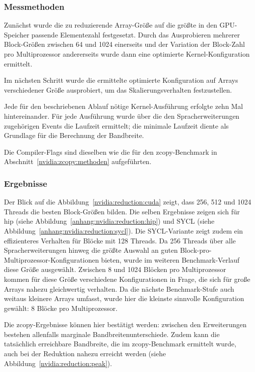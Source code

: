 \subsubsection{Messmethoden}
\label{nvidia:reduction:methoden}

Zunächst wurde die zu reduzierende Array-Größe auf die größte in den
GPU-Speicher passende Elementezahl festgesetzt. Durch das Ausprobieren mehrerer
Block-Größen zwischen \num{64} und \num{1024} einerseits und der Variation der
Block-Zahl pro Multiprozessor andererseits wurde dann eine optimierte
Kernel-Konfiguration ermittelt.

Im nächsten Schritt wurde die ermittelte optimierte Konfiguration auf Arrays
verschiedener Größe ausprobiert, um das Skalierungsverhalten festzustellen.

Jede für den beschriebenen Ablauf nötige Kernel-Ausführung erfolgte zehn Mal
hintereinander. Für jede Ausführung wurde über die den Spracherweiterungen
zugehörigen Events die Laufzeit ermittelt; die minimale Laufzeit diente als
Grundlage für die Berechnung der Bandbreite.

Die Compiler-Flags sind dieselben wie die für den zcopy-Benchmark in
Abschnitt~\ref{nvidia:zcopy:methoden} aufgeführten.

\subsubsection{Ergebnisse}

Der Blick auf die Abbildung~\ref{nvidia:reduction:cuda} zeigt, dass \num{256},
\num{512} und \num{1024} Threads die besten Block-Größen bilden. Die selben
Ergebnisse zeigen sich für \gls{hip} (siehe
Abbildung~\ref{anhang:nvidia:reduction:hip}) und SYCL (siehe
Abbildung~\ref{anhang:nvidia:reduction:sycl}). Die SYCL-Variante zeigt zudem ein
effizienteres Verhalten für Blöcke mit \num{128} Threads.  Da \num{256} Threads
über alle Spracherweiterungen hinweg die  größte Auswahl an guten
Block-pro-Multiprozessor-Konfigurationen bieten, wurde im weiteren
Benchmark-Verlauf diese Größe ausgewählt. Zwischen \num{8} und \num{1024}
Blöcken pro Multiprozessor kommen für diese Größe verschiedene Konfigurationen
in Frage, die sich für große Arrays nahezu gleichwertig verhalten. Da die
nächste Benchmark-Stufe auch weitaus kleinere Arrays umfasst, wurde hier die
kleinste sinnvolle Konfiguration gewählt: \num{8} Blöcke pro Multiprozessor. 

Die zcopy-Ergebnisse können hier bestätigt werden: zwischen den Erweiterungen
bestehen allenfalls marginale Bandbreitenunterschiede. Zudem kann die
tatsächlich erreichbare Bandbreite, die im zcopy-Benchmark ermittelt wurde,
auch bei der Reduktion nahezu erreicht werden (siehe
Abbildung~\ref{nvidia:reduction:peak}).


